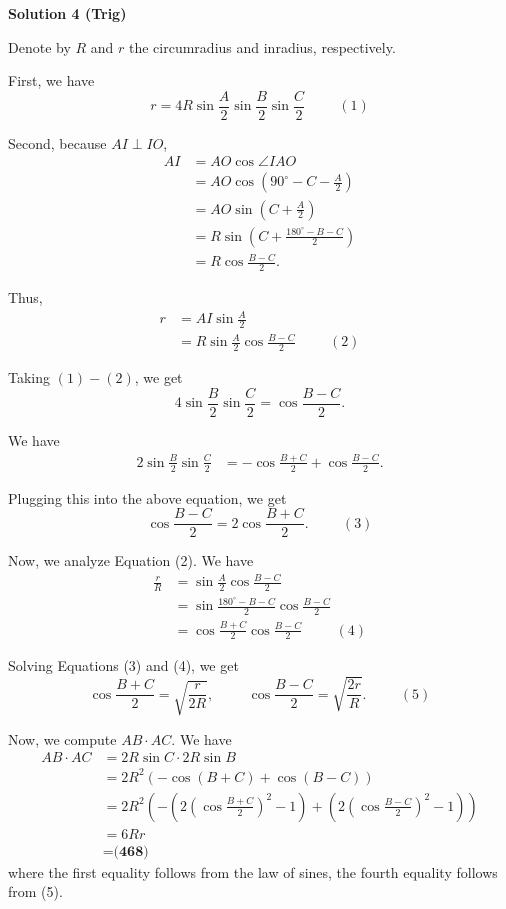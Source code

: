 \begin{enumerate}
\textbf{Solution 4 (Trig)}

Denote by $R$ and $r$ the circumradius and inradius, respectively.

 First, we have
 \[ r = 4 R \sin \frac{A}{2} \sin \frac{B}{2} \sin \frac{C}{2} \hspace{1cm} (1) \]

 Second, because $AI \perp IO$,\begin{align*}AI & = AO \cos \angle IAO \\& = AO \cos \left( 90^\circ - C - \frac{A}{2} \right) \\& = AO \sin \left( C + \frac{A}{2} \right) \\& = R \sin \left( C + \frac{180^\circ - B - C}{2} \right) \\& = R \cos \frac{B - C}{2} .\end{align*}


 Thus,\begin{align*}r & = AI \sin \frac{A}{2} \\& = R \sin \frac{A}{2} \cos \frac{B-C}{2} \hspace{1cm} (2)\end{align*}


 Taking $(1) - (2)$, we get
 \[4 \sin \frac{B}{2} \sin \frac{C}{2} = \cos \frac{B-C}{2} .\]

 We have\begin{align*}2 \sin \frac{B}{2} \sin \frac{C}{2}& = - \cos \frac{B+C}{2} + \cos \frac{B-C}{2} .\end{align*}


 Plugging this into the above equation, we get
 \[\cos \frac{B-C}{2} = 2 \cos \frac{B+C}{2} . \hspace{1cm} (3)\]

 Now, we analyze Equation (2). We have\begin{align*}\frac{r}{R} & = \sin \frac{A}{2} \cos \frac{B-C}{2} \\& = \sin \frac{180^\circ - B - C}{2} \cos \frac{B-C}{2} \\& = \cos \frac{B+C}{2} \cos \frac{B-C}{2} \hspace{1cm} (4)\end{align*}


 Solving Equations (3) and (4), we get
 \[\cos \frac{B+C}{2} = \sqrt{\frac{r}{2R}}, \hspace{1cm} \cos \frac{B-C}{2} = \sqrt{\frac{2r}{R}} . \hspace{1cm} (5)\]

 Now, we compute $AB \cdot AC$. We have\begin{align*}AB \cdot AC & = 2R \sin C \cdot 2R \sin B \\& = 2 R^2 \left( - \cos \left( B + C \right) + \cos \left( B - C \right) \right) \\& = 2 R^2 \left( - \left( 2 \left( \cos \frac{B+C}{2} \right)^2 - 1 \right)+ \left( 2 \left( \cos \frac{B-C}{2} \right)^2 - 1 \right) \right) \\& = 6 R r \\& = \boxed{\textbf{(468) }}\end{align*}
where the first equality follows from the law of sines, the fourth equality follows from (5).


\end{enumerate}
